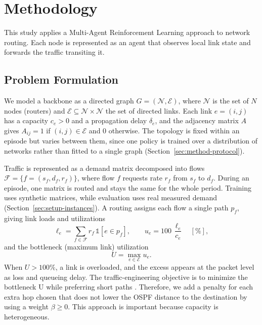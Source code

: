 \section{Methodology}
This study applies a Multi-Agent Reinforcement Learning approach to network routing. Each node is represented as an agent that observes local link state and forwards the traffic transiting it.

\subsection{Problem Formulation}
We model a backbone as a directed graph $G=(\mathcal{N},\mathcal{E})$, where
$\mathcal{N}$ is the set of $N$ nodes (routers) and
$\mathcal{E}\subseteq\mathcal{N}\times\mathcal{N}$ the set of directed links. Each
link $e=(i,j)$ has a capacity $c_e>0$ and a propagation delay $\delta_e$, and the
adjacency matrix $A$ gives $A_{ij}=1$ if $(i,j)\in\mathcal{E}$ and $0$ otherwise.
The topology is fixed within an episode but varies between them, since one policy
is trained over a distribution of networks rather than fitted to a single graph
(Section~\ref{sec:method-protocol}).

Traffic is represented as a demand matrix decomposed into flows $\mathcal{F}=\{f=(s_f,d_f,r_f)\}$, where flow $f$ requests rate $r_f$ from $s_f$ to
$d_f$. During an episode, one matrix is routed and stays the same for the whole period. Training uses synthetic matrices, while evaluation uses real measured demand (Section~\ref{sec:setup-instances}).
A routing assigns each flow a single path $p_f$, giving link loads and utilizations
\begin{equation}\label{eq:load}
\ell_e=\sum_{f\in\mathcal{F}} r_f\,\mathbb{1}\!\left[e\in p_f\right],
\qquad
u_e=100\,\frac{\ell_e}{c_e}\quad[\%],
\end{equation}
and the bottleneck (maximum link) utilization
\begin{equation}\label{eq:bottleneck}
U=\max_{e\in\mathcal{E}} u_e .
\end{equation}
When $U>100\%$, a link is overloaded, and the excess appears at the packet level as loss and queueing delay. The traffic-engineering objective is to minimize the bottleneck U while preferring short paths \citep{832225}. Therefore, we add a penalty for each extra hop chosen that does not lower the OSPF distance to the destination by using a weight $\beta\ge0$. This approach is important because capacity is heterogeneous.

